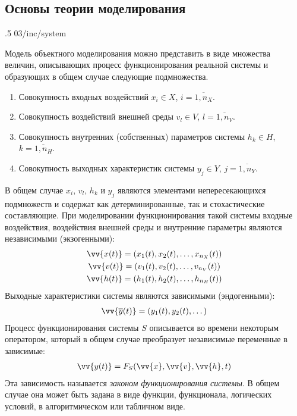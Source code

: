 \subsection{Основы теории моделирования}

\image
{.5\textwidth}
{03/inc/system}
{}

Модель объектного моделирования можно представить в виде множества величин, описывающих процесс функционирования реальной системы и образующих в общем случае следующие подмножества.

\begin{enumerate}
    \item Совокупность входных воздействий $x_i\in X$, $i = \overline{1, n_X}$.
    \item Совокупность воздействий внешней среды $v_l\in V$, $l = \overline{1, n_V}$.
    \item Совокупность внутренних (собственных) параметров системы $h_k\in H$, $k = \overline{1, n_H}$.
    \item Совокупность выходных характеристик системы $y_j\in Y$, $j = \overline{1, n_Y}$.
\end{enumerate}

В общем случае $x_i$, $v_l$, $h_k$ и $y_j$ являются элементами непересекающихся подмножеств и содержат как детерминированные, так и стохастические составляющие. При моделировании функционирования такой системы входные воздействия, воздействия внешней среды и внутренние параметры являются независимыми (экзогенными):
%
\begin{gather*}
    \vv{x(t)} = (x_1(t), x_2(t), \dots, x_{n_X}(t))\\
    \vv{v(t)} = (v_1(t), v_2(t), \dots, v_{n_V}(t))\\
    \vv{h(t)} = (h_1(t), h_2(t), \dots, h_{n_H}(t))
\end{gather*}
%
Выходные характеристики системы являются зависимыми (эндогенными):
%
\begin{gather*}
    \vv{\overline{y}(t)} = (y_1(t), y_2(t), \dots)
\end{gather*}
%
Процесс функционирования системы $S$ описывается во времени некоторым оператором, который в общем случае преобразует независимые переменные в зависимые:
%
\begin{gather*}
    \vv{y(t)} = F_S(\vv{x}, \vv{v}, \vv{h}, t)
\end{gather*}
%
Эта зависимость называется \textit{законом функционирования системы}. В общем случае она может быть задана в виде функции, функционала, логических условий, в алгоритмическом или табличном виде.

